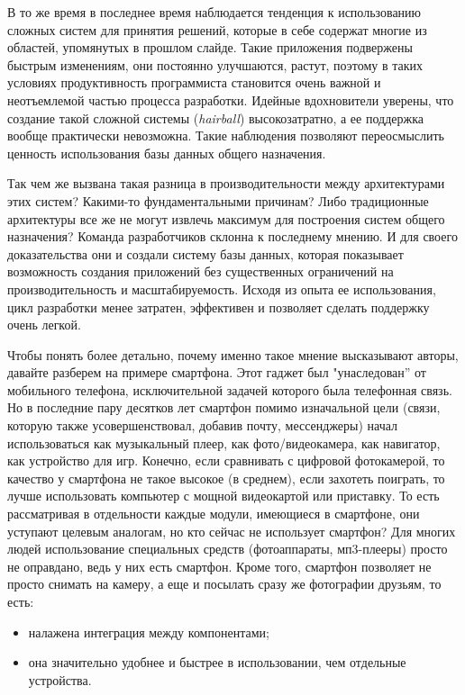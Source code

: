 В то же время в последнее время наблюдается тенденция к использованию сложных систем для принятия решений, которые в себе содержат многие из областей, упомянутых в прошлом слайде. Такие приложения подвержены быстрым изменениям, они постоянно улучшаются, растут, поэтому в таких условиях продуктивность программиста становится очень важной и неотъемлемой частью процесса разработки. Идейные вдохновители \LB уверены, что создание такой сложной системы (\emph{hairball}) высокозатратно, а ее поддержка вообще практически невозможна. Такие наблюдения позволяют переосмыслить ценность использования базы данных общего назначения.

Так чем же вызвана такая разница в производительности между архитектурами этих систем? Какими-то фундаментальными причинам? Либо традиционные архитектуры все же не могут извлечь максимум для построения систем общего назначения? Команда разработчиков \LB склонна к последнему мнению. И для своего доказательства они и создали систему базы данных, которая показывает возможность создания приложений без существенных ограничений на производительность и масштабируемость. Исходя из опыта ее использования, цикл разработки менее затратен, эффективен и позволяет сделать поддержку очень легкой.

Чтобы понять более детально, почему именно такое мнение высказывают авторы, давайте разберем на примере смартфона. Этот гаджет был "унаследован” от мобильного телефона, исключительной задачей которого была телефонная связь. Но в последние пару десятков лет смартфон помимо изначальной цели (связи, которую также усовершенствовал, добавив почту, мессенджеры) начал использоваться как музыкальный плеер, как фото/видеокамера, как навигатор, как устройство для игр. Конечно, если сравнивать с цифровой фотокамерой, то качество у смартфона не такое высокое (в среднем), если захотеть поиграть, то лучше использовать компьютер с мощной видеокартой или приставку. То есть рассматривая в отдельности каждые модули, имеющиеся в смартфоне, они уступают целевым аналогам, но кто сейчас не использует смартфон? Для многих людей использование специальных средств (фотоаппараты, мп3-плееры) просто не оправдано, ведь у них есть смартфон. Кроме того, смартфон позволяет не просто снимать на камеру, а еще и посылать сразу же фотографии друзьям, то есть:

\begin{itemize}
	\item налажена интеграция между компонентами;
	\item она значительно удобнее и быстрее в использовании, чем отдельные устройства.
\end{itemize}

